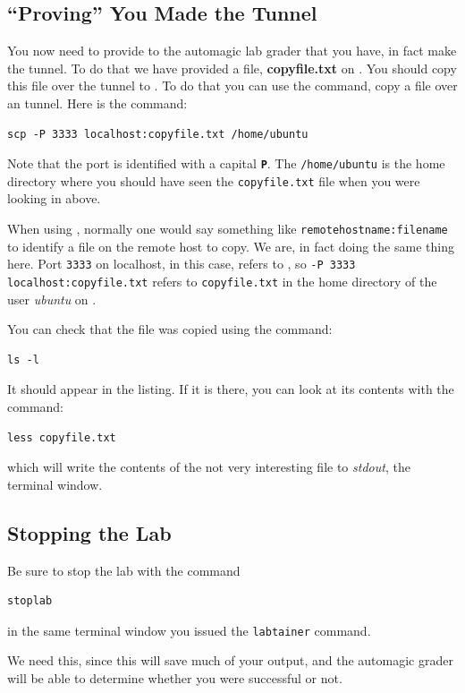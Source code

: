 \subsection{``Proving'' You Made the Tunnel}
You now need to provide to the automagic lab grader that you have, in
fact make the tunnel. To do that we have provided a file,
\textbf{copyfile.txt} on .  You should copy this file over the
tunnel to \base.  To do that you can use the \scp command, copy a file
over an \ssh tunnel. Here is the command:
\begin{verbatim}
scp -P 3333 localhost:copyfile.txt /home/ubuntu
\end{verbatim}
Note that the port is identified with a capital \textbf{\texttt{P}}.
The \texttt{/home/ubuntu} is the home directory where you should have
seen the \texttt{copyfile.txt} file when you were looking in 
above.

When using \scp, normally one would say something like
\verb|remotehostname:filename| to identify a file on the remote host
to copy.  We are, in fact doing the same thing here. Port
\texttt{3333} on localhost, in this case, refers to , so
\verb|-P 3333 localhost:copyfile.txt| refers to \texttt{copyfile.txt}
in the home directory of the user \textit{ubuntu} on .

You can check that the file was copied using the command:
\begin{verbatim}
ls -l
\end{verbatim}
It should appear in the listing.  If it is there, you can look at its
contents with the command:
\begin{verbatim}
less copyfile.txt
\end{verbatim}
which will write the contents of the not very interesting file to
\textit{stdout}, the terminal window.


\subsection{Stopping the Lab}
Be sure to stop the lab with the command
\begin{verbatim}
stoplab
\end{verbatim}
in the same terminal window you issued the \verb|labtainer| command.

We need this, since this will save much of your output, and the
automagic grader will be able to determine whether you were successful
or not.


